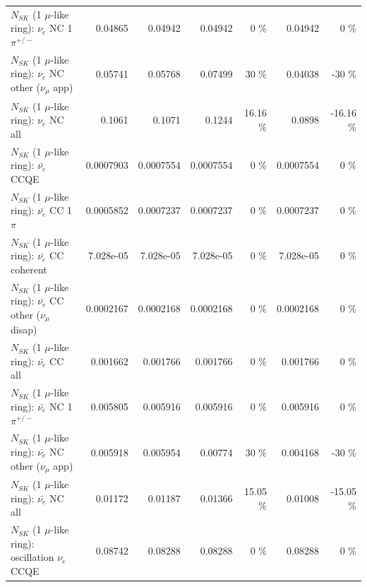 \begin{table}
\begin{tabular}{| l | r | r | r  r | r  r |}
\hline
                           $N_{SK}$ (1 $\mu$-like ring): $\nu_e$ NC 1$\pi^{+/-}$ &         0.04865 &         0.04942 &         0.04942 &        0 \%  &         0.04942 &        0 \%  \\ 
                  $N_{SK}$ (1 $\mu$-like ring): $\nu_e$ NC other ($\nu_\mu$ app) &         0.05741 &         0.05768 &         0.07499 &       30 \%  &         0.04038 &      -30 \%  \\ 
                                  $N_{SK}$ (1 $\mu$-like ring): $\nu_{e}$ NC all &          0.1061 &          0.1071 &          0.1244 &    16.16 \%  &          0.0898 &   -16.16 \%  \\ 
\hline
\hline
\hline
                                $N_{SK}$ (1 $\mu$-like ring): $\bar{\nu_e}$ CCQE &       0.0007903 &       0.0007554 &       0.0007554 &        0 \%  &       0.0007554 &        0 \%  \\ 
                           $N_{SK}$ (1 $\mu$-like ring): $\bar{\nu_e}$ CC 1$\pi$ &       0.0005852 &       0.0007237 &       0.0007237 &        0 \%  &       0.0007237 &        0 \%  \\ 
                         $N_{SK}$ (1 $\mu$-like ring): $\bar{\nu_e}$ CC coherent &       7.028e-05 &       7.028e-05 &       7.028e-05 &        0 \%  &       7.028e-05 &        0 \%  \\ 
          $N_{SK}$ (1 $\mu$-like ring): $\bar{\nu_e}$ CC other ($\nu_\mu$ disap) &       0.0002167 &       0.0002168 &       0.0002168 &        0 \%  &       0.0002168 &        0 \%  \\ 
                            $N_{SK}$ (1 $\mu$-like ring): $\bar{\nu_{e}}$ CC all &        0.001662 &        0.001766 &        0.001766 &        0 \%  &        0.001766 &        0 \%  \\ 
\hline
                     $N_{SK}$ (1 $\mu$-like ring): $\bar{\nu_e}$ NC 1$\pi^{+/-}$ &        0.005805 &        0.005916 &        0.005916 &        0 \%  &        0.005916 &        0 \%  \\ 
            $N_{SK}$ (1 $\mu$-like ring): $\bar{\nu_e}$ NC other ($\nu_\mu$ app) &        0.005918 &        0.005954 &         0.00774 &       30 \%  &        0.004168 &      -30 \%  \\ 
                            $N_{SK}$ (1 $\mu$-like ring): $\bar{\nu_{e}}$ NC all &         0.01172 &         0.01187 &         0.01366 &    15.05 \%  &         0.01008 &   -15.05 \%  \\ 
\hline
\hline
\hline
                          $N_{SK}$ (1 $\mu$-like ring): oscillation $\nu_e$ CCQE &         0.08742 &         0.08288 &         0.08288 &        0 \%  &         0.08288 &        0 \%  \\ 

\end{tabular}
\end{table}
